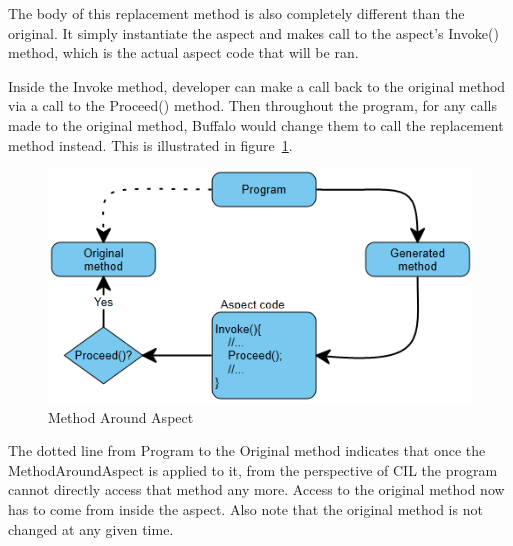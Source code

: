 The body of this replacement method is also completely different than the original. It simply instantiate the aspect and makes call to the aspect’s Invoke() method, which is the actual aspect code that will be ran. 

Inside the Invoke method, developer can make a call back to the original method via a call to the Proceed() method. Then throughout the program, for any calls made to the original method, Buffalo would change them to call the replacement method instead. This is illustrated in figure~\ref{around_overview}.

\begin{figure}[H]
  \includegraphics[scale=1.0]{AroundOverview.PNG}
  \centering
  \caption{Method Around Aspect\label{around_overview}}
\end{figure}

The dotted line from Program to the Original method indicates that once the MethodAroundAspect is applied to it, from the perspective of CIL the program cannot directly access that method any more. Access to the original method now has to come from inside the aspect. Also note that the original method is not changed at any given time.
